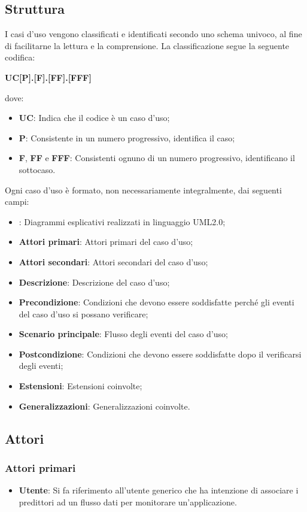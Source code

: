 \documentclass[../analisi-dei-requisiti.tex]{subfiles}
\begin{document}
\subsection{Struttura}%
\label{subs:struttura}
I casi d'uso vengono classificati e identificati secondo uno schema univoco, al fine di facilitarne la lettura e la comprensione. La classificazione segue la seguente codifica:
\begin{center}
  \centering
  \textbf{UC[P].[F].[FF].[FFF]}
\end{center} dove:
\begin{itemize}
  \item \textbf{UC}: Indica che il codice è un caso d'uso;
  \item \textbf{P}: Consistente in un numero progressivo, identifica il caso;
  \item \textbf{F}, \textbf{FF} e \textbf{FFF}: Consistenti ognuno di un numero progressivo, identificano il sottocaso.
\end{itemize}
Ogni caso d'uso è formato, non necessariamente integralmente, dai seguenti campi:
\begin{itemize}
  \item \textbf{}: Diagrammi esplicativi realizzati in linguaggio UML2.0;
  \item \textbf{Attori primari}: Attori primari del caso d'uso;
  \item \textbf{Attori secondari}: Attori secondari del caso d'uso;
  \item \textbf{Descrizione}: Descrizione del caso d'uso;
  \item \textbf{Precondizione}: Condizioni che devono essere soddisfatte perché gli eventi del caso d'uso si possano verificare;
  \item \textbf{Scenario principale}: Flusso degli eventi del caso d'uso;
  \item \textbf{Postcondizione}: Condizioni che devono essere soddisfatte dopo il verificarsi degli eventi;
  \item \textbf{Estensioni}: Estensioni coinvolte;
  \item \textbf{Generalizzazioni}: Generalizzazioni coinvolte.
\end{itemize}

\subsection{Attori}%
\label{subs:attori}

\subsubsection{Attori primari}%
\label{sssec:attori_primari}
\begin{itemize}
  \item \textbf{Utente}: Si fa riferimento all'utente generico che ha intenzione di associare i predittori ad un flusso dati per monitorare un'applicazione.
\end{itemize}
\end{document}

